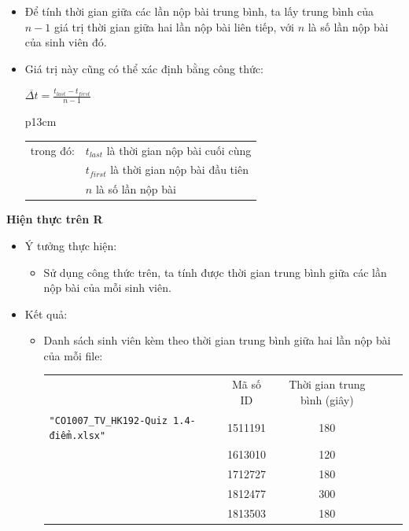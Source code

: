 \documentclass[a4paper]{article}
\theoremstyle{definition}
\begin{document}
\begin{enumerate}[a)]
\begin{itemize}
\begin{itemize}
            \item Để tính thời gian giữa các lần nộp bài trung bình, ta lấy trung bình của $n-1$ giá trị thời gian giữa hai lần nộp bài liên tiếp, với $n$ là số lần nộp bài của sinh viên đó.
            \item Giá trị này cũng có thể xác định bằng công thức:
            \begin{center}
                $\overline{\Delta t} = \frac{t_{last} - t_{first}}{n - 1}$\\
                \begin{tabular}{p{13cm}}
                     \begin{tabular}{l l}
                          trong đó: & $t_{last}$ là thời gian nộp bài cuối cùng\\
                          & $t_{first}$ là thời gian nộp bài đầu tiên\\
                          & $n$ là số lần nộp bài
                     \end{tabular}
                \end{tabular}
            \end{center}
        \end{itemize}
    \end{itemize}
    \bf Hiện thực trên R\normalfont
    \begin{itemize}
        \item Ý tưởng thực hiện:
        \begin{itemize}
            \item Sử dụng công thức trên, ta tính được thời gian trung bình giữa các lần nộp bài của mỗi sinh viên.
        \end{itemize}
        \item Kết quả:
        \begin{itemize}
            \item Danh sách sinh viên kèm theo thời gian trung bình giữa hai lần nộp bài của mỗi file:
            \begin{center}
                \begin{tabular}{l c c c c}
                     & Mã số ID & Thời gian trung bình (giây)\\
                     \texttt{"CO1007\_TV\_HK192-Quiz 1.4-điểm.xlsx"} & 1511191 & 180 \\ & 1613010 & 120 \\ & 1712727 & 180 \\ & 1812477 & 300 \\ & 1813503 & 180\\

\end{tabular}
\end{center}
\end{itemize}
\end{itemize}
\end{enumerate}
\end{document}
